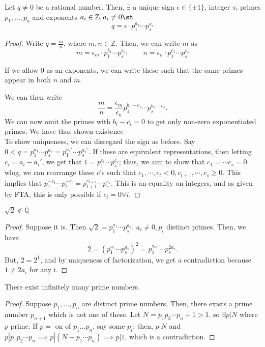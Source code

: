 \documentclass[12pt,oneside]{article}
\begin{document}
\begin{theorem}
  Let $q\neq 0$ be a rational number. Then, $\exists$ a unique sign $\epsilon \in \{\pm 1\}$, integer $s$, primes $p_1, \dots, p_a$ and exponents $a_i \in \mathbb{Z}, a_i \neq 0 \st$
  \[q = \epsilon \cdot p_1^{a_1} \cdots p_s^{a_s}\]
\end{theorem}
\begin{proof}
  Write $q = \frac{m}{n}$, where $m,n \in \mathbb{Z}$. Then, we can write $m$ as \[m = \epsilon_m \cdot p_1^{b_1} \cdots p_s^{b_s};\qquad n = \epsilon_n \cdot p_1^{c_1}\cdots p_s^{c_s}\]
  \begin{remark}
    If we allow 0 as an exponents, we can write these such that the same primes appear in both $n$ and $m$.
  \end{remark}
  We can then write \[\frac{m}{n} = \frac{\epsilon_m}{\epsilon_n} p_1^{b_1-c_1}\cdots p_s^{b_s-c_s}.\] We can now omit the primes with $b_i - c_i = 0$ to get only non-zero exponentiated primes. We have thus shown existence\\
  To show uniqueness, we can disregard the sign as before.  Say $0 < q = p_1^{a_1}\cdots p_s^{a_s} = p_1^{a_1'}\cdots p_s^{a_s'}$. If these are equivalent representations, then letting $c_i = a_i - a_i'$, we get that $1 = p_1^{c_1} \cdots p_s^{c_s}$; thus, we aim to show that $c_1 = \cdots c_s = 0$. wlog, we can rearrange these $c$'s such that $c_1, \cdots , c_t < 0, c_{t+1} , \cdots, c_s \geq 0$. This implies that $p_1^{-c_1} \cdots p_t^{-c_t} = p_{t+1}^{c_{t+1}} \cdots p_s^{c_s}$. This is an equality on integers, and as given by FTA, this is only possible if $c_i = 0 \forall i$.
\end{proof}

\begin{proposition}
  $\sqrt{2} \notin \mathbb{Q}$
\end{proposition}
\begin{proof}
  Suppose it is. Then $\sqrt{2} = p_1^{a_1}\cdots p_s^{a_s}$, $a_i \neq 0, p_i$ distinct primes. Then, we have \[2 = (p_1^{a_1} \cdots p_s^{a_s})^2 = p_1^{2a_1}\cdots p_s^{2a_s}.\] But, $2 = 2^1$, and by uniqueness of factorization, we get a contradiction because $1  \neq 2a_{i}$ for any i.
\end{proof}

\begin{theorem}
  There exist infinitely many prime numbers.
\end{theorem}

\begin{proof}
  Suppose $p_1, \dots, p_n$ are distinct prime numbers. Then, there exists a prime number $p_{n+1}$ which is not one of these. Let $N = p_1 p_2 \cdots p_n +1 > 1$, so $\exists p|N$ where $p$ prime. If $p =$ on of $p_1 \dots p_n$, say some $p_i$; then, $p | N$ and $p | p_1 p_2 \cdots p_n \implies p | (N - p_1 \cdots p_n) \implies p | 1$, which is a contradiction.
\end{proof}
\end{document}
